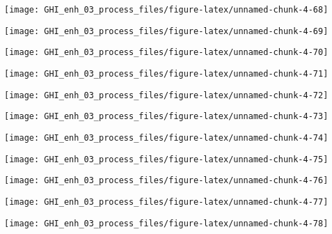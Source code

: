\documentclass[
  10pt,
  a4paper,oneside]{article}
\begin{document}
\begin{center}\texttt{[image: GHI\_enh\_03\_process\_files/figure-latex/unnamed-chunk-4-68]} \end{center}

\begin{center}\texttt{[image: GHI\_enh\_03\_process\_files/figure-latex/unnamed-chunk-4-69]} \end{center}

\begin{center}\texttt{[image: GHI\_enh\_03\_process\_files/figure-latex/unnamed-chunk-4-70]} \end{center}

\begin{center}\texttt{[image: GHI\_enh\_03\_process\_files/figure-latex/unnamed-chunk-4-71]} \end{center}

\begin{center}\texttt{[image: GHI\_enh\_03\_process\_files/figure-latex/unnamed-chunk-4-72]} \end{center}

\begin{center}\texttt{[image: GHI\_enh\_03\_process\_files/figure-latex/unnamed-chunk-4-73]} \end{center}

\begin{center}\texttt{[image: GHI\_enh\_03\_process\_files/figure-latex/unnamed-chunk-4-74]} \end{center}

\begin{center}\texttt{[image: GHI\_enh\_03\_process\_files/figure-latex/unnamed-chunk-4-75]} \end{center}

\begin{center}\texttt{[image: GHI\_enh\_03\_process\_files/figure-latex/unnamed-chunk-4-76]} \end{center}

\begin{center}\texttt{[image: GHI\_enh\_03\_process\_files/figure-latex/unnamed-chunk-4-77]} \end{center}

\begin{center}\texttt{[image: GHI\_enh\_03\_process\_files/figure-latex/unnamed-chunk-4-78]} \end{center}
\end{document}
